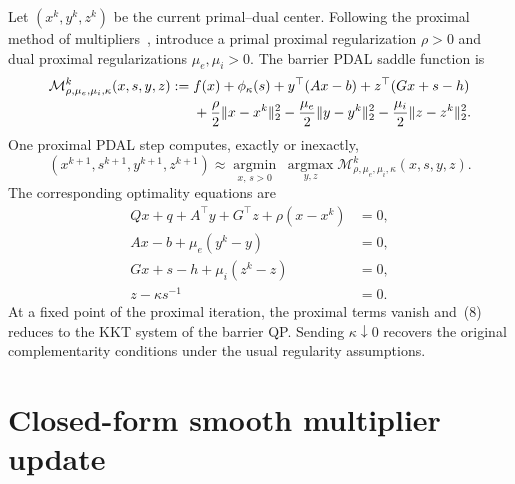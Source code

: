 \documentclass[10pt]{article}
\begin{document}
Let $(x^k,y^k,z^k)$ be the current primal--dual center. Following the proximal method of multipliers~\cite{rockafellar1976}, introduce a primal proximal regularization $\rho>0$ and dual proximal regularizations $\mu_e,\mu_i>0$. The barrier PDAL saddle function is
\begin{align}
\mathcal{M}_{\rho,\mu_e,\mu_i,\kappa}^k(x,s,y,z)
:={}&f(x)+\phi_\kappa(s)
  +y^\top(Ax-b)+z^\top(Gx+s-h)\notag\\
&+\frac{\rho}{2}\lVert x-x^k\rVert_2^2
  -\frac{\mu_e}{2}\lVert y-y^k\rVert_2^2
  -\frac{\mu_i}{2}\lVert z-z^k\rVert_2^2.
\end{align}
One proximal PDAL step computes, exactly or inexactly,
\begin{equation}
(x^{k+1},s^{k+1},y^{k+1},z^{k+1})
\approx
\underset{x,\,s>0}{\operatorname{argmin}}
\;\underset{y,z}{\operatorname{argmax}}
\mathcal{M}_{\rho,\mu_e,\mu_i,\kappa}^k(x,s,y,z).
\end{equation}
The corresponding optimality equations are
\begin{equation}
\begin{aligned}
Qx+q+A^\top y+G^\top z+\rho(x-x^k)&=0,\\
Ax-b+\mu_e(y^k-y)&=0,\\
Gx+s-h+\mu_i(z^k-z)&=0,\\
z-\kappa s^{-1}&=0.
\end{aligned}
\end{equation}
At a fixed point of the proximal iteration, the proximal terms vanish and~(8) reduces to the KKT system of the barrier QP. Sending $\kappa\downarrow0$ recovers the original complementarity conditions under the usual regularity assumptions.

\section{Closed-form smooth multiplier update}
\end{document}
